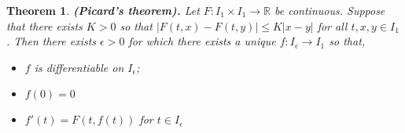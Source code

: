 \documentclass[11pt,a4paper]{article}
\theoremstyle{definition}
\theoremstyle{plain}
\newtheorem{theorem}{Theorem}[section]
\newcommand{\R}{\mathbb{R}}
\newcommand{\abs}[1]{\left\lvert #1\right\rvert}
\renewcommand{\tt}[1]{\textnormal{\textbf{(#1).}}} %
\begin{document}
  \begin{theorem}
    \tt{Picard's theorem}
    Let $F \colon I_1 \times I_1 \to \R$ be continuous. Suppose that there 
    exists $K > 0$ so that $\abs{F(t,x) - F(t,y)} \le K\abs{x - y}$ for all 
    $t, x, y \in I_1$. Then there exists $\epsilon > 0$ for which there 
    exists a unique $f \colon I_{\epsilon} \to I_{1}$ so that,
    \begin{itemize}
      \item $f$ is differentiable on $I_{\epsilon}$;
      \item $f(0)=0$
      \item $f'(t) = F(t,f(t))$ for $t \in I_{\epsilon}$
    \end{itemize}
  \end{theorem}

  \newpage
\end{document}
